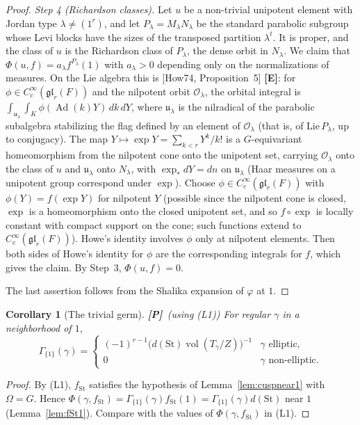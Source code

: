 \documentclass[12pt]{article}
\newcommand{\Ad}{\operatorname{Ad}}
\newcommand{\vol}{\operatorname{vol}}
\newcommand{\St}{\mathrm{St}}
\newcommand{\Pv}{\textbf{[P]}}
\newcommand{\Ev}{\textbf{[E]}}
\theoremstyle{plain}
\newtheorem{corollary}[theorem]{Corollary}
\theoremstyle{definition}
\begin{document}
\begin{proof}
\emph{Step 4 (Richardson classes).} Let $u$ be a non-trivial unipotent element with Jordan type $\lambda\ne(1^r)$, and let $P_\lambda=M_\lambda N_\lambda$ be the standard parabolic subgroup whose Levi blocks have the sizes of the transposed partition $\lambda^t$. It is proper, and the class of $u$ is the Richardson class of $P_\lambda$, the dense orbit in $N_\lambda$. We claim that $\Phi(u,f)=a_\lambda f^{P_\lambda}(1)$ with $a_\lambda>0$ depending only on the normalizations of measures. On the Lie algebra this is [How74, Proposition~5] \Ev: for $\phi\in C_c^\infty(\mathfrak{gl}_r(F))$ and the nilpotent orbit $\mathcal O_\lambda$, the orbital integral is $\int_{\mathfrak u_\lambda}\int_K\phi(\Ad(k)Y)\,dk\,dY$, where $\mathfrak u_\lambda$ is the nilradical of the parabolic subalgebra stabilizing the flag defined by an element of $\mathcal O_\lambda$ (that is, of $\mathrm{Lie}\,P_\lambda$, up to conjugacy). The map $Y\mapsto\exp Y=\sum_{k<r}Y^k/k!$ is a $G$-equivariant homeomorphism from the nilpotent cone onto the unipotent set, carrying $\mathcal O_\lambda$ onto the class of $u$ and $\mathfrak u_\lambda$ onto $N_\lambda$, with $\exp_*dY=dn$ on $\mathfrak u_\lambda$ (Haar measures on a unipotent group correspond under $\exp$). Choose $\phi\in C_c^\infty(\mathfrak{gl}_r(F))$ with $\phi(Y)=f(\exp Y)$ for nilpotent $Y$ (possible since the nilpotent cone is closed, $\exp$ is a homeomorphism onto the closed unipotent set, and so $f\circ\exp$ is locally constant with compact support on the cone; such functions extend to $C_c^\infty(\mathfrak{gl}_r(F))$). Howe's identity involves $\phi$ only at nilpotent elements. Then both sides of Howe's identity for $\phi$ are the corresponding integrals for $f$, which gives the claim. By Step~3, $\Phi(u,f)=0$.

The last assertion follows from the Shalika expansion of $\varphi$ at $1$.
\end{proof}

\begin{corollary}[The trivial germ]\label{cor:trivgerm}\Pv\ (using (L1))
For regular $\gamma$ in a neighborhood of $1$,
\[ \Gamma_{\{1\}}(\gamma)=\begin{cases}(-1)^{r-1}\big(d(\St)\vol(T_\gamma/Z)\big)^{-1}&\gamma\text{ elliptic},\\ 0&\gamma\text{ non-elliptic}.\end{cases} \]
\end{corollary}
\begin{proof}
By (L1), $f_{\St}$ satisfies the hypothesis of Lemma~\ref{lem:cuspnear1} with $\Omega=G$. Hence $\Phi(\gamma,f_{\St})=\Gamma_{\{1\}}(\gamma)f_{\St}(1)=\Gamma_{\{1\}}(\gamma)d(\St)$ near $1$ (Lemma~\ref{lem:fSt1}). Compare with the values of $\Phi(\gamma,f_{\St})$ in (L1).
\end{proof}
\end{document}

